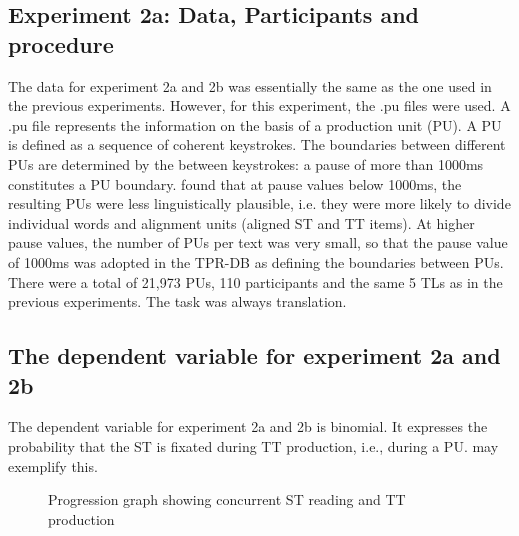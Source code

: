 \documentclass[output=paper]{LSP/langsci}
\begin{document}
\subsection{Experiment 2a: Data, Participants and procedure}

The data for experiment 2a and 2b was essentially the same as the one used in the previous experiments. However, for this experiment, the .pu files were used. A .pu file represents the information on the basis of a production unit (PU). A PU is defined as a sequence of coherent keystrokes. The boundaries between different PUs are determined by the  between keystrokes: a pause of more than 1000ms constitutes a PU boundary. \citet{Carl2011Gazing} found that at pause values below 1000ms, the resulting PUs were less linguistically plausible, i.e. they were more likely to divide individual words and alignment units (aligned ST and TT items). At higher pause values, the number of PUs per text was very small, so that the pause value of 1000ms was adopted in the TPR-DB as defining the boundaries between PUs. There were a total of 21,973 PUs, 110 participants and the same 5 TLs as in the previous experiments. The task was always translation.

\subsection{The dependent variable for experiment 2a and 2b}

The dependent variable for experiment 2a and 2b is binomial. It expresses the probability that the ST is fixated during TT production, i.e., during a PU.  may exemplify this.

\begin{figure}[p]
\caption{Progression graph showing concurrent ST reading and TT production}
\label{schaeffer-carl:fig:4}
\end{figure}
\end{document}
